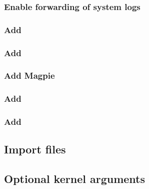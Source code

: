\documentclass{ohpc-doc}
\begin{document}
\subsubsection{Enable forwarding of system logs} \label{sec:add_syslog}


\subsubsection{Add \clustershell{}}


\subsubsection{Add \genders{}}


\subsubsection{Add Magpie}


\subsubsection{Add \conman{}} \label{sec:add_conman}


\subsubsection{Add \nhc{}} \label{sec:add_nhc}



\subsection{Import files} \label{sec:file_import}








\subsection{Optional kernel arguments} \label{sec:optional_kargs}


\end{document}
